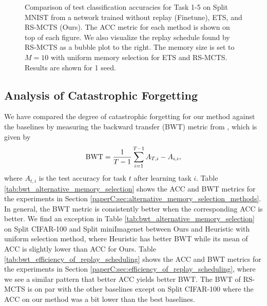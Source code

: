 \begin{figure}[t]
  \centering
  \setlength{\figwidth}{0.27\textwidth}
  \setlength{\figheight}{.15\textheight}
  
  \vspace{-3mm}
  \caption{ Comparison of test classification accuracies for Task 1-5 on Split MNIST from a network trained without replay (Finetune), ETS, and RS-MCTS (Ours). The ACC metric for each method is shown on top of each figure. We also visualize the replay schedule found by RS-MCTS as a bubble plot to the right. The memory size is set to $M=10$ with uniform memory selection for ETS and RS-MCTS. Results are shown for 1 seed. 
  }
  \vspace{-3mm}
  \label{fig:split_mnist_task_accuracies_and_bubble_plot}
\end{figure}

\subsection{Analysis of Catastrophic Forgetting}\label{app:analysis_of_catastrophic_forgetting}

We have compared the degree of catastrophic forgetting for our method against the baselines by measuring the backward transfer (BWT) metric from \citet{lopez2017gradient}, which is given by
\begin{align}
    \textnormal{BWT} = \frac{1}{T-1} \sum_{i=1}^{T-1} A_{T, i} - A_{i, i},
\end{align}
where $A_{t, i}$ is the test accuracy for task $t$ after learning task $i$. Table \ref{tab:bwt_alternative_memory_selection} shows the ACC and BWT metrics for the experiments in Section \ref{paperC:sec:alternative_memory_selection_methods}. In general, the BWT metric is consistently better when the corresponding ACC is better. We find an exception in Table \ref{tab:bwt_alternative_memory_selection} on Split CIFAR-100 and Split miniImagenet between Ours and Heuristic with uniform selection method, where Heuristic has better BWT while its mean of ACC is slightly lower than ACC for Ours. Table \ref{tab:bwt_efficiency_of_replay_scheduling} shows the ACC and BWT metrics for the experiments in Section \ref{paperC:sec:efficiency_of_replay_scheduling}, where we see a similar pattern that better ACC yields better BWT. The BWT of RS-MCTS is on par with the other baselines except on Split CIFAR-100 where the ACC on our method was a bit lower than the best baselines.



